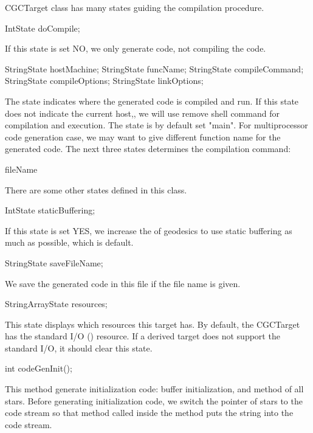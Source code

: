 CGCTarget class has many states guiding the compilation procedure.

\begin{example}
IntState doCompile;
\end{example}

If this state is set NO, we only generate code, not compiling the code.

\begin{example}
StringState hostMachine;
StringState funcName;
StringState compileCommand;
StringState compileOptions;
StringState linkOptions;
\end{example}

The  state indicates where the generated code is compiled
and run. If this state does not indicate the current host,, we will use
remove shell command for compilation and execution. The 
state is by default set "main". For multiprocessor code generation case,
we may want to give different function name for the generated code.
The next three states determines the compilation command:

  fileName 

There are some other states defined in this class.

\begin{example}
IntState staticBuffering;
\end{example}

If this state is set YES, we increase the  of geodesics
to use static buffering as much as possible, which is default.

\begin{example}
StringState saveFileName;
\end{example}

We save the generated code in this file if the file name is given.

\begin{example}
StringArrayState resources;
\end{example}

This state displays which resources this target has. By default, the
CGCTarget has the standard I/O () resource. If a derived
target does not support the standard I/O, it should clear this state.

\begin{example}
int codeGenInit();
\end{example}

This method generate initialization code: buffer initialization, and
 method of all stars. Before generating initialization code,
we switch the  pointer of stars to the  code
stream so that  method called inside the 
method puts the string into the  code stream.

